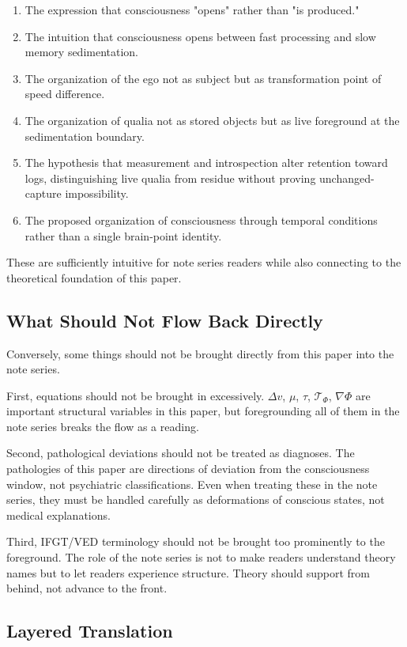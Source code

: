 \begin{enumerate}
\item The expression that consciousness "opens" rather than "is produced."
\item The intuition that consciousness opens between fast processing and slow memory sedimentation.
\item The organization of the ego not as subject but as transformation point of speed difference.
\item The organization of qualia not as stored objects but as live foreground at the sedimentation boundary.
\item The hypothesis that measurement and introspection alter retention toward logs, distinguishing live qualia from residue without proving unchanged-capture impossibility.
\item The proposed organization of consciousness through temporal conditions rather than a single brain-point identity.
\end{enumerate}

These are sufficiently intuitive for note series readers while also connecting to the theoretical foundation of this paper.

\subsection{What Should Not Flow Back Directly}


Conversely, some things should not be brought directly from this paper into the note series.

First, equations should not be brought in excessively. $\Delta v$, $\mu$, $\tau$, $\mathcal{T}_{\Phi}$, $\nabla\Phi$ are important structural variables in this paper, but foregrounding all of them in the note series breaks the flow as a reading.

Second, pathological deviations should not be treated as diagnoses. The pathologies of this paper are directions of deviation from the consciousness window, not psychiatric classifications. Even when treating these in the note series, they must be handled carefully as deformations of conscious states, not medical explanations.

Third, IFGT/VED terminology should not be brought too prominently to the foreground. The role of the note series is not to make readers understand theory names but to let readers experience structure. Theory should support from behind, not advance to the front.

\subsection{Layered Translation}


